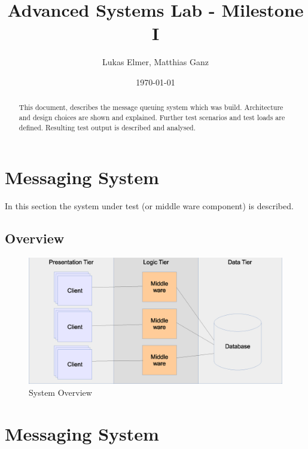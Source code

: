 \documentclass{article}
\title{Advanced Systems Lab - Milestone I}
\author{Lukas Elmer, Matthias Ganz}
\date{\today}
\begin{document}
\maketitle


\begin{abstract}

This document, describes the message queuing system which was build. Architecture and design choices are shown and explained. Further test scenarios and test loads are defined. Resulting test output is described and analysed.

\end{abstract}

\section{Messaging System}
In this section the system under test (or middle ware component) is described.


\subsection{Overview}

\begin{figure}
  \begin{center}
    \includegraphics[scale=0.4]{../drawings/system-overview.eps}
  \end{center}
  \caption{System Overview}
  \label{fig:system-overview}
\end{figure}


\section{Messaging System}
\end{document}
